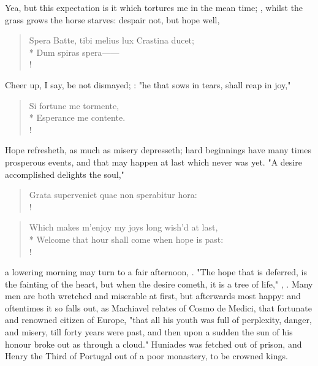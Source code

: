 {Yea, but this expectation is it which tortures me in the mean time; , whilst the grass grows the horse starves: despair not, but hope well,

\begin{latin}
\begin{verse}%
Spera Batte, tibi melius lux Crastina ducet;\\*
Dum spiras spera------\\!
\end{verse}%
\end{latin}

Cheer up, I say, be not dismayed; : "he that sows in tears, shall reap in joy," 

\begin{latin}
\begin{verse}%
Si fortune me tormente,\\*
Esperance me contente.\\!
\end{verse}%
\end{latin}

Hope refresheth, as much as misery depresseth; hard beginnings have many times prosperous events, and that may happen at last which never was yet. "A desire accomplished delights the soul," 

\begin{latin}
\begin{verse}%
Grata superveniet quae non sperabitur hora:\\!
\end{verse}%
\end{latin}



\begin{verse}%
Which makes m'enjoy my joys long wish'd at last,\\*
Welcome that hour shall come when hope is past:\\!
\end{verse}%

a lowering morning may turn to a fair afternoon, . "The hope that is deferred, is the fainting of the heart, but when the desire cometh, it is a tree of life," , . Many men are both wretched and miserable at first, but afterwards most happy: and oftentimes it so falls out, as Machiavel relates of Cosmo de Medici, that fortunate and renowned citizen of Europe, "that all his youth was full of perplexity, danger, and misery, till forty years were past, and then upon a sudden the sun of his honour broke out as through a cloud." Huniades was fetched out of prison, and Henry the Third of Portugal out of a poor monastery, to be crowned kings.

}
